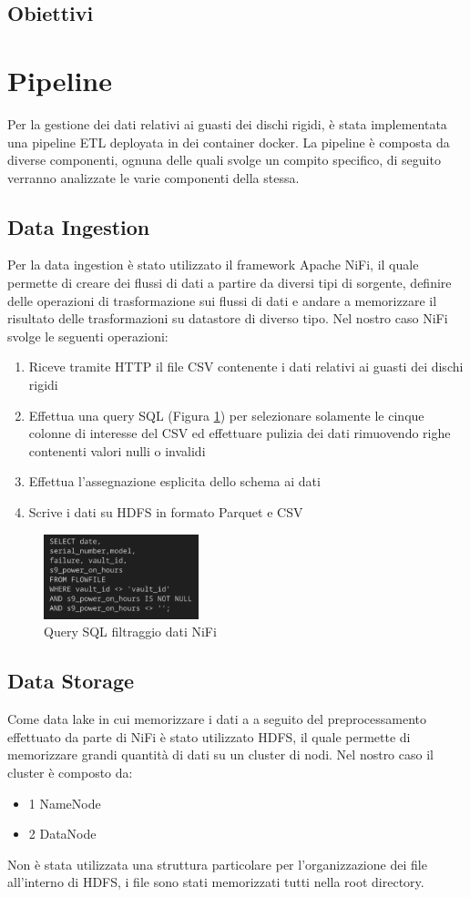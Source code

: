 \documentclass[conference]{IEEEtran}
\begin{document}
\subsection{Obiettivi}
\section{Pipeline}
Per la gestione dei dati relativi ai guasti dei dischi rigidi, è stata implementata una pipeline ETL deployata in dei container docker. La pipeline è composta da diverse componenti, ognuna delle quali svolge un compito specifico, di seguito verranno analizzate le varie componenti della stessa.
\subsection{Data Ingestion}
Per la data ingestion è stato utilizzato il framework Apache NiFi, il quale permette di creare dei flussi di dati a partire da diversi tipi di sorgente, definire delle operazioni di trasformazione sui flussi di dati e andare a memorizzare il risultato delle trasformazioni su datastore di diverso tipo. Nel nostro caso NiFi svolge le seguenti operazioni:
\begin{enumerate}
    \item Riceve tramite HTTP il file CSV contenente i dati relativi ai guasti dei dischi rigidi
    \item Effettua una query SQL (Figura \ref{fig:nifi_query}) per selezionare solamente le cinque colonne di interesse del CSV ed effettuare pulizia dei dati rimuovendo righe contenenti valori nulli o invalidi
    \item Effettua l'assegnazione esplicita dello schema ai dati
    \item Scrive i dati su HDFS in formato Parquet e CSV
\end{enumerate}
\begin{figure}[H]
    \centering
    \includegraphics[width=0.4\textwidth]{./res/query_nifi.png}
    \caption{Query SQL filtraggio dati NiFi}
    \label{fig:nifi_query}
\end{figure} 
\subsection{Data Storage}
Come data lake in cui memorizzare i dati a a seguito del preprocessamento effettuato da parte di NiFi è stato utilizzato HDFS, il quale permette di memorizzare grandi quantità di dati su un cluster di nodi. Nel nostro caso il cluster è composto da:
\begin{itemize}
    \item 1 NameNode
    \item 2 DataNode
\end{itemize}
Non è stata utilizzata una struttura particolare per l'organizzazione dei file all'interno di HDFS, i file sono stati memorizzati tutti nella root directory. 
\end{document}
